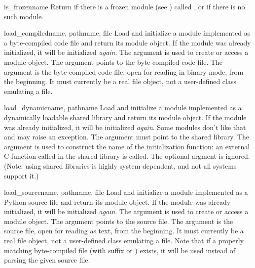 \begin{funcdesc}{is_frozen}{name}
Return  if there is a frozen module (see
) called , or  if there is
no such module.
\end{funcdesc}

\begin{funcdesc}{load_compiled}{name, pathname, file}
Load and initialize a module implemented as a byte-compiled code file
and return its module object.  If the module was already initialized,
it will be initialized \emph{again}.  The  argument is used
to create or access a module object.  The  argument
points to the byte-compiled code file.  The 
argument is the byte-compiled code file, open for reading in binary
mode, from the beginning.
It must currently be a real file object, not a
user-defined class emulating a file.
\end{funcdesc}

\begin{funcdesc}{load_dynamic}{name, pathname}
Load and initialize a module implemented as a dynamically loadable
shared library and return its module object.  If the module was
already initialized, it will be initialized \emph{again}.  Some modules
don't like that and may raise an exception.  The 
argument must point to the shared library.  The  argument is
used to construct the name of the initialization function: an external
C function called  in the shared library is
called.  The optional  argment is ignored.  (Note: using
shared libraries is highly system dependent, and not all systems
support it.)
\end{funcdesc}

\begin{funcdesc}{load_source}{name, pathname, file}
Load and initialize a module implemented as a Python source file and
return its module object.  If the module was already initialized, it
will be initialized \emph{again}.  The  argument is used to
create or access a module object.  The  argument points
to the source file.  The  argument is the source
file, open for reading as text, from the beginning.
It must currently be a real file
object, not a user-defined class emulating a file.  Note that if a
properly matching byte-compiled file (with suffix  or
) exists, it will be used instead of parsing the given
source file.
\end{funcdesc}


